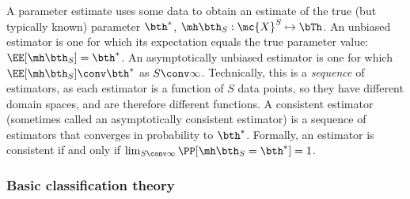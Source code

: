 A parameter estimate uses some data to obtain an estimate of the true (but typically known) parameter $\bth^*$, $\hth_S: \mc{X}^S \mapsto \bTh$.  An unbiased estimator is one for which its expectation equals the true parameter value: $\EE[\hth_S] = \bth^*$.  An asymptotically unbiased estimator is one for which $\EE[\hth_S] \conv \bth^*$ as $S \conv \infty$. Technically, this is a \emph{sequence} of estimators, as each estimator is a function of $S$ data points, so they have different domain spaces, and are therefore different functions.   A consistent estimator (sometimes called an asymptotically consistent estimator) is a sequence of estimators that converges in probability to $\bth^*$. Formally, an estimator is consistent if and only if $\lim_{S\conv \infty} \PP[\hth_S=\bth^*]=1$.





\subsubsection{Basic classification theory} %
\label{sub:basic_classification_theory}


